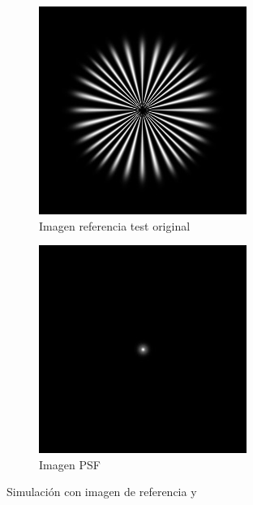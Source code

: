 \documentclass{./packages/optica-article}
\begin{document}
\begin{figure}[hbp]
\centering

\begin{subfigure}[t]{0.45\textwidth}\centering
    \centering
    \includegraphics[width=\textwidth]{Simulation deconvolution/ref.jpg}
    \caption{Imagen referencia test original}
    \label{f:REF}
\end{subfigure}
\hfill
\begin{subfigure}[t]{0.45\textwidth}\centering
    \includegraphics[width=\textwidth]{Simulation deconvolution/psf.jpg}
    \caption{Imagen PSF}
    \label{f:psf}
\end{subfigure}

\caption{Simulación con imagen de referencia y }\label{fig:psf-ref}
\end{figure}
\end{document}
